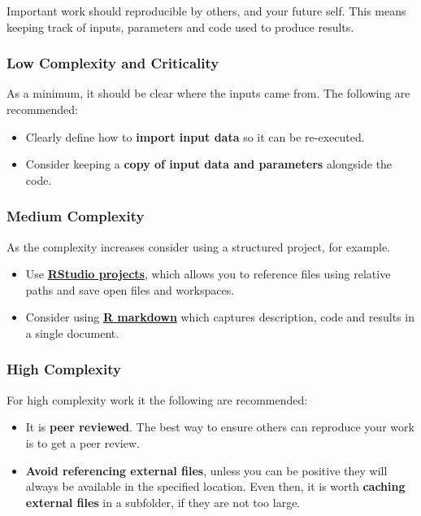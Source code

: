 \documentclass[]{book}
\providecommand{\tightlist}{%
  \setlength{\itemsep}{0pt}\setlength{\parskip}{0pt}}
\begin{document}
Important work should reproducible by others, and your future self. This means keeping
track of inputs, parameters and code used to produce results.

\hypertarget{low-complexity-and-criticality-2}{%
\subsubsection{Low Complexity and Criticality}\label{low-complexity-and-criticality-2}}

As a minimum, it should be clear where the inputs came from. The following are recommended:

\begin{itemize}
\tightlist
\item
  Clearly define how to \textbf{import input data} so it can be re-executed.
\item
  Consider keeping a \textbf{copy of input data and parameters} alongside the code.
\end{itemize}

\hypertarget{medium-complexity-2}{%
\subsubsection{Medium Complexity}\label{medium-complexity-2}}

As the complexity increases consider using a structured project, for example.

\begin{itemize}
\tightlist
\item
  Use
  \textbf{\href{https://support.rstudio.com/hc/en-us/articles/200526207-Using-Projects}{RStudio projects}},
  which allows you to reference files
  using relative paths and save open files and workspaces.
\item
  Consider using \textbf{\href{https://rmarkdown.rstudio.com/lesson-1.html}{R markdown}} which captures
  description, code and results in a single document.
\end{itemize}

\hypertarget{high-complexity-2}{%
\subsubsection{High Complexity}\label{high-complexity-2}}

For high complexity work it the following are recommended:

\begin{itemize}
\tightlist
\item
  It is \textbf{peer reviewed}. The best way to ensure others can reproduce your work is to get a peer
  review.
\item
  \textbf{Avoid referencing external files}, unless you can be positive they will always be available
  in the specified location. Even then, it is worth \textbf{caching external files} in a subfolder, if
  they are not too large.
\end{itemize}
\end{document}

